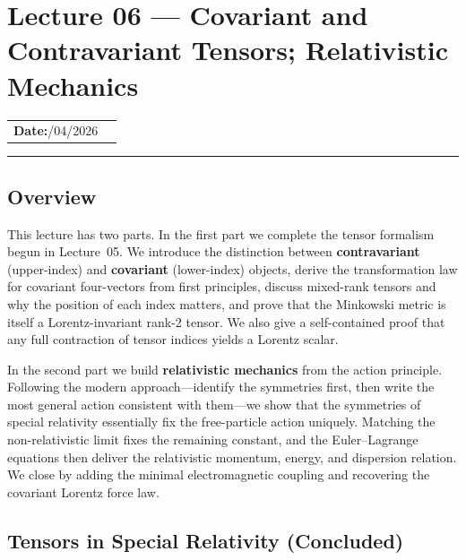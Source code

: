 \section{Lecture 06 — Covariant and Contravariant Tensors; Relativistic Mechanics}\label{sec:lec06}

\begin{center}
\begin{tabular}{ll}
  \textbf{Date:}\quad 21/04/2026   & \\
\end{tabular}
\end{center}
\hrule\vspace{1.5em}

\subsection*{Overview}
This lecture has two parts.  In the first part we complete the tensor
formalism begun in Lecture~05.  We introduce the distinction between
\textbf{contravariant} (upper-index) and \textbf{covariant} (lower-index)
objects, derive the transformation law for covariant four-vectors from first
principles, discuss mixed-rank tensors and why the position of each index
matters, and prove that the Minkowski metric is itself a Lorentz-invariant
rank-2 tensor.  We also give a self-contained proof that any full contraction
of tensor indices yields a Lorentz scalar.

In the second part we build \textbf{relativistic mechanics} from the action
principle.  Following the modern approach—identify the symmetries first,
then write the most general action consistent with them—we show that the
symmetries of special relativity essentially fix the free-particle action
uniquely.  Matching the non-relativistic limit fixes the remaining constant,
and the Euler--Lagrange equations then deliver the relativistic momentum,
energy, and dispersion relation.  We close by adding the minimal
electromagnetic coupling and recovering the covariant Lorentz force law.

\subsection{Tensors in Special Relativity (Concluded)}

